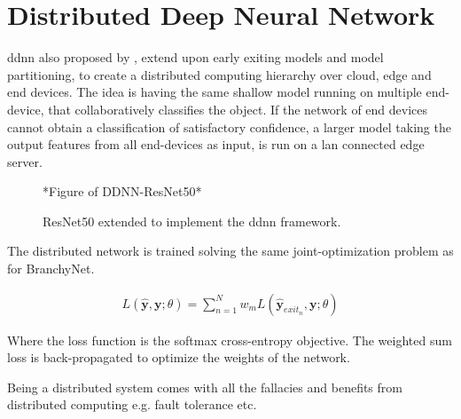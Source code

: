 \section{Distributed Deep Neural Network}

\gls{ddnn} \cite{teerapittayanon_distributed_2017} also proposed by \citeauthor{teerapittayanon_distributed_2017}, extend upon early exiting models and model partitioning,  to  create a distributed computing hierarchy over cloud, edge and end devices. The idea is having the same shallow model running on multiple end-device, that collaboratively classifies the object. If the network of end devices cannot obtain a classification of satisfactory confidence, a larger model taking the output features from all end-devices as input, is run on a \gls{lan} connected edge server. 

\begin{figure}
	*Figure of DDNN-ResNet50*
	\caption[\gls{ddnn}-ResNet architecture]{ResNet50 extended to implement the \gls{ddnn} framework.}
	\label{ddnn-resnet}
\end{figure}

The distributed network is trained solving the same joint-optimization problem as for BranchyNet.

\begin{align*}
L(\hat{\mathbf{y}},\mathbf{y};\theta) = \sum_{n=1}^{N} w_m L(\hat{\mathbf{y}}_{exit_n},\mathbf{y};\theta)
\end{align*}

Where the loss function is the softmax cross-entropy objective.
The weighted sum loss is back-propagated to optimize the weights of the network. 

Being a distributed system comes with all the fallacies and benefits from distributed computing e.g. fault tolerance etc.